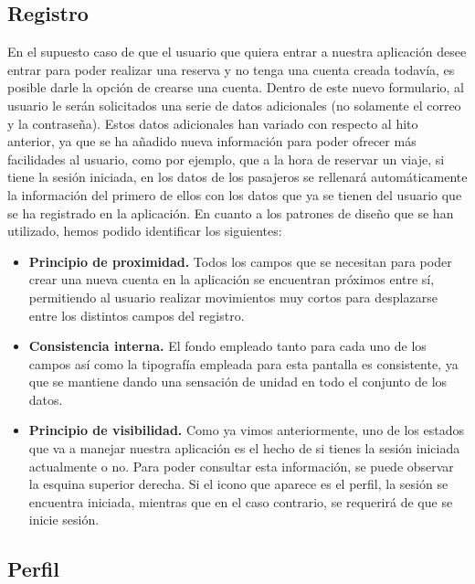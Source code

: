 \subsection*{Registro}

En el supuesto caso de que el usuario que quiera entrar a nuestra aplicación desee entrar para
poder realizar una reserva y no tenga una cuenta creada todavía, es posible darle la opción de
crearse una cuenta. Dentro de este nuevo formulario, al usuario le serán solicitados una serie
de datos adicionales (no solamente el correo y la contraseña). Estos datos adicionales han
variado con respecto al hito anterior, ya que se ha añadido nueva información para poder ofrecer
más facilidades al usuario, como por ejemplo, que a la hora de reservar un viaje, si tiene la
sesión iniciada, en los datos de los pasajeros se rellenará automáticamente la información del
primero de ellos con los datos que ya se tienen del usuario que se ha registrado en la aplicación.
En cuanto a los patrones de diseño que se han utilizado, hemos podido identificar los siguientes:

\begin{itemize}
    \item \textbf{Principio de proximidad.} Todos los campos que se necesitan para poder crear una nueva
        cuenta en la aplicación se encuentran próximos entre sí, permitiendo al usuario realizar
        movimientos muy cortos para desplazarse entre los distintos campos del registro.
    \item \textbf{Consistencia interna.} El fondo empleado tanto para cada uno de los campos así
        como la tipografía empleada para esta pantalla es consistente, ya que se mantiene dando
        una sensación de unidad en todo el conjunto de los datos.
    \item \textbf{Principio de visibilidad.} Como ya vimos anteriormente, uno de los estados que va a
        manejar nuestra aplicación es el hecho de si tienes la sesión iniciada actualmente o no.
        Para poder consultar esta información, se puede observar la esquina superior derecha. Si
        el icono que aparece es el perfil, la sesión se encuentra iniciada, mientras que en el
        caso contrario, se requerirá de que se inicie sesión.
\end{itemize}

\subsection*{Perfil}

